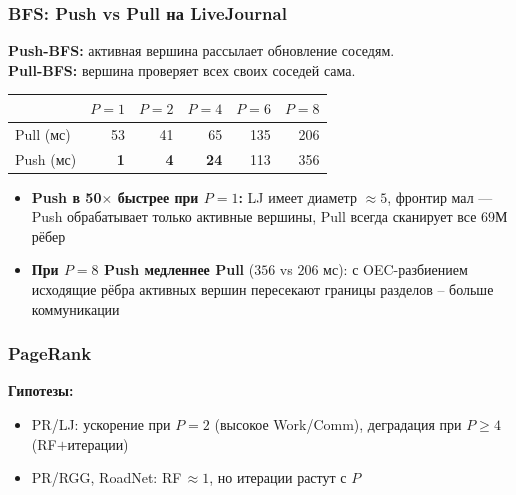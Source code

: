 \documentclass[aspectratio=169]{beamer}
\begin{document}
\begin{frame}
  \frametitle{BFS: Push vs Pull на LiveJournal}

  \textbf{Push-BFS:} активная вершина рассылает обновление соседям.\\
  \textbf{Pull-BFS:} вершина проверяет всех своих соседей сама.

  \begin{center}
  {\small
  \begin{tabular}{lrrrrr}
    \hline
    & $P=1$ & $P=2$ & $P=4$ & $P=6$ & $P=8$ \\
    \hline
    Pull (мс) & 53  & 41  & 65  & 135 & 206 \\
    Push (мс) & \textbf{1}   & \textbf{4}   & \textbf{24}  & 113 & 356 \\
    \hline
  \end{tabular}
  }
  \end{center}

  \begin{itemize}
    \item \textbf{Push в 50$\times$ быстрее при $P{=}1$:}
          LJ имеет диаметр $\approx 5$, фронтир мал ---
          Push обрабатывает только активные вершины,
          Pull всегда сканирует все 69М рёбер

    \item \textbf{При $P{=}8$ Push медленнее Pull} ($356$ vs $206$ мс):
          с OEC-разбиением исходящие рёбра активных вершин
          пересекают границы разделов -- больше коммуникации
  \end{itemize}
\end{frame}


\begin{frame}
  \frametitle{PageRank}

  \textbf{Гипотезы:}
  \begin{itemize}
    \item PR/LJ: ускорение при $P{=}2$ (высокое Work/Comm),
          деградация при $P{\ge}4$ (RF$+$итерации)
    \item PR/RGG, RoadNet: RF\,$\approx 1$, но итерации растут с $P$
  \end{itemize}
\end{frame}
\end{document}
